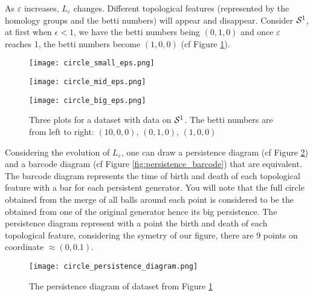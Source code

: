 \documentclass[12pt, a4paper]{article}
\begin{document}
As $\varepsilon$ increases, $L_\varepsilon$ changes. Different topological features (represented by the homology groups and the betti numbers) will appear and disappear. Consider $\S^1$, at first when $\epsilon < 1$, we have the betti numbers being $(0,1,0)$ and once $\varepsilon$ reaches 1, the betti numbers become $(1,0,0)$ (cf Figure \ref{fig:betti_s1}). 

\begin{figure}[h]
  \begin{minipage}[c]{.32\linewidth}
             \centering
            \texttt{[image: circle\_small\_eps.png]}
         \end{minipage}
         \hfill%
         \begin{minipage}[c]{.32\linewidth}
             \centering
            \texttt{[image: circle\_mid\_eps.png]}
        \end{minipage}
         \hfill%
         \begin{minipage}[c]{.32\linewidth}
             \centering
            \texttt{[image: circle\_big\_eps.png]}
        \end{minipage}
        \caption{Three plots for a dataset with data on $\S^1$. The betti numbers are from left to right: $(10,0,0)$, $(0,1,0)$, $(1,0,0)$}
  \label{fig:betti_s1}
\end{figure}

Considering the evolution of $L_\varepsilon$, one can draw a persistence diagram (cf Figure \ref{fig:persistence_diagram}) and a barcode diagram (cf Figure \ref{fig:persistence_barcode}) that are equivalent. The barcode diagram represents the time of birth and death of each topological feature with a bar for each persistent generator. You will note that the full circle obtained from the merge of all balls around each point is considered to be the obtained from one of the original generator hence its big persistence. The persistence diagram represent with a point the birth and death of each topological feature, considering the symetry of our figure, there are 9 points on coordinate $\approx(0,0.1)$.\\ 

\begin{figure}[p]
             \centering
            \texttt{[image: circle\_persistence\_diagram.png]}
        \caption{The persistence diagram of dataset from Figure \ref{fig:betti_s1}}
        \label{fig:persistence_diagram}
\end{figure}
\end{document}

